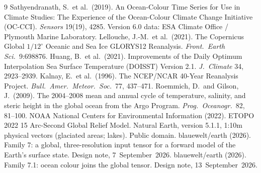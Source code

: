 \documentclass[10pt]{article}
\begin{document}
\begin{thebibliography}{9}\small
{} Sathyendranath, S.\ et al.\ (2019). An Ocean-Colour Time
Series for Use in Climate Studies: The Experience of the Ocean-Colour Climate
Change Initiative (OC-CCI). \emph{Sensors} 19(19), 4285. Version 6.0 data:
ESA Climate Office / Plymouth Marine Laboratory.
 Lellouche, J.-M.\ et al.\ (2021). The Copernicus Global
$1/12^\circ$ Oceanic and Sea Ice GLORYS12 Reanalysis. \emph{Front.\ Earth
Sci.}\ 9:698876.
 Huang, B.\ et al.\ (2021). Improvements of the Daily Optimum
Interpolation Sea Surface Temperature (DOISST) Version 2.1. \emph{J.\
Climate} 34, 2923--2939.
 Kalnay, E.\ et al.\ (1996). The NCEP/NCAR 40-Year Reanalysis
Project. \emph{Bull.\ Amer.\ Meteor.\ Soc.}\ 77, 437--471.
 Roemmich, D.\ and Gilson, J.\ (2009). The 2004--2008 mean and
annual cycle of temperature, salinity, and steric height in the global ocean
from the Argo Program. \emph{Prog.\ Oceanogr.}\ 82, 81--100.
 NOAA National Centers for Environmental Information (2022).
ETOPO 2022 15 Arc-Second Global Relief Model.
 Natural Earth, version 5.1.1, 1:10m physical vectors
(glaciated areas; lakes). Public domain.
 blauewelt/earth (2026). Family 7: a global, three-resolution
input tensor for a forward model of the Earth's surface state. Design note,
7~September~2026.
 blauewelt/earth (2026). Family 7.1: ocean colour joins the
global tensor. Design note, 13~September~2026.
\end{thebibliography}
\end{document}

